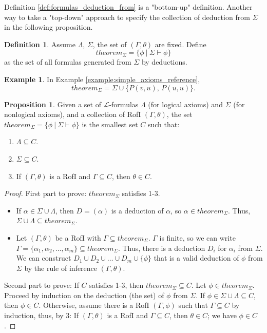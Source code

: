 \documentclass[11pt,letterpaper]{book}
\theoremstyle{definition}
\newtheorem{definition}{Definition}[section]
\newtheorem{proposition}{Proposition}[section]
\newtheorem{example}{Example}[section]
\begin{document}
Definition \ref{def:formulas_deduction_from} is a "bottom-up"
definition. Another way to take a "top-down" approach to specify the
collection of deduction from $\Sigma$ in the following proposition.

\begin{definition}
Assume $\Lambda$, $\Sigma$, the set of $(\Gamma,\theta)$ are fixed. Define
$$theorem_{\Sigma} = \{ \phi \ |\ \Sigma \vdash \phi \}$$
as the set of all formulas generated from $\Sigma$ by deductions.
\end{definition}

\begin{example}
In Example \ref{example:simple_axioms_reference}, $$theorem_{\Sigma} =
\Sigma \cup \{ P(v,u), \, P(u,u) \}.$$
\end{example}


\begin{proposition}\label{proposition:smallest_set_of_infer_rules}
Given a set of $\mathcal{L}$-formulas $\Lambda$ (for logical axioms) and
$\Sigma$ (for nonlogical axioms), and a collection of RofI $(\Gamma,
\theta)$, the set $theorem_{\Sigma} = \{ \phi \ |\ \Sigma
\vdash \phi \}$ is the smallest set $C$ such that:
\begin{enumerate}
\item{$\Lambda \subseteq C$.}
\item{$\Sigma \subseteq C$.}
\item{If $(\Gamma, \theta)$ is a RofI and $\Gamma \subseteq
C$, then $\theta \in C$.}
\end{enumerate}
\end{proposition}

\begin{proof}
First part to prove: $theorem_{\Sigma}$ satisfies 1-3.
\begin{itemize}
\item{If $\alpha \in \Sigma \cup \Lambda$, then $D=(\alpha)$ is a
deduction of $\alpha$, so $\alpha \in theorem_{\Sigma}$. Thus, $\Sigma
\cup \Lambda \subseteq theorem_{\Sigma}$.}
\item{Let $(\Gamma, \theta)$ be a RofI with $\Gamma
\subseteq theorem_{\Sigma}$. $\Gamma$ is finite, so we can write $\Gamma
=\{ \alpha_1, \alpha_2, \ldots, \alpha_m \} \subseteq theorem_{\Sigma}
$. Thus, there is a deduction $D_i$ for $\alpha_i$ from $\Sigma$. We can
construct $D_1 \cup D_2 \cup \ldots \cup D_m \cup \{ \phi \}$ that is a
valid deduction of $\phi$ from $\Sigma$ by the rule of inference
$(\Gamma, \theta)$. }

\end{itemize}

Second part to prove: If $C$ satisfies 1-3, then $theorem_{\Sigma}
\subseteq C $. Let $\phi \in theorem_{\Sigma}$. Proceed by induction on
the deduction (the set) of $\phi$ from $\Sigma$. If $\phi \in \Sigma
\cup \Lambda \subseteq C$, then $\phi \in C$. Otherwise, assume there is
a RofI $(\Gamma, \phi)$ such that $\Gamma \subseteq C$ by induction,
thus, by 3: If $(\Gamma, \theta)$ is a RofI and $\Gamma
\subseteq C$, then $\theta \in C$; we have $\phi \in C$.
\end{proof}
\end{document}
